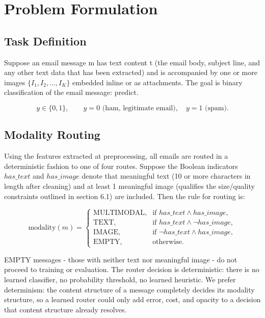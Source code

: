 \documentclass[10pt,twoside]{article}
\begin{document}
\section{Problem Formulation}\label{sec:4}

\subsection{Task Definition}\label{sec:4.1}

Suppose an email message m has text content t (the email body, subject line, and any other text data that has been extracted) and is accompanied by one or more images $\{I_1, I_2, \ldots, I_K\}$ embedded inline or as attachments. The goal is binary classification of the email message: predict.

\begin{equation}\label{eq:2}
y \in \{0, 1\}, \qquad y = 0 \text{ (ham, legitimate email)}, \quad y = 1 \text{ (spam)}.
\end{equation}

\subsection{Modality Routing}\label{sec:4.2}

Using the features extracted at preprocessing, all emails are routed in a deterministic fashion to one of four routes. Suppose the Boolean indicators $has\_text$ and $has\_image$ denote that meaningful text (10 or more characters in length after cleaning) and at least 1 meaningful image (qualifies the size/quality constraints outlined in section 6.1) are included. Then the rule for routing is:

\begin{equation}\label{eq:3}
\text{modality}(m) = \begin{cases} \text{MULTIMODAL}, & \text{if } has\_text \wedge has\_image, \\ \text{TEXT}, & \text{if } has\_text \wedge \neg has\_image, \\ \text{IMAGE}, & \text{if } \neg has\_text \wedge has\_image, \\ \text{EMPTY}, & \text{otherwise.} \end{cases}
\end{equation}

EMPTY messages - those with neither text nor meaningful image - do not proceed to training or evaluation. The router decision is deterministic: there is no learned classifier, no probability threshold, no learned heuristic. We prefer determinism: the content structure of a message completely decides its modality structure, so a learned router could only add error, cost, and opacity to a decision that content structure already resolves.
\end{document}
